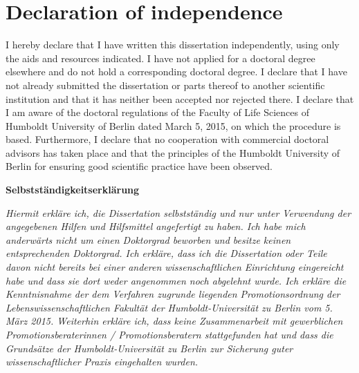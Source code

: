\backmatter
\mygeometry
{}
\RaggedRight

\mygeometry
\chapter{Declaration of independence}
\justifying
I hereby declare that I have written this dissertation independently, using only the aids and resources indicated. I have not applied for a doctoral degree elsewhere and do not hold a corresponding doctoral degree. I declare that I have not already submitted the dissertation or parts thereof to another scientific institution and that it has neither been accepted nor rejected there. I declare that I am aware of the doctoral regulations of the Faculty of Life Sciences of Humboldt University of Berlin dated March 5, 2015, on which the procedure is based. Furthermore, I declare that no cooperation with commercial doctoral advisors has taken place and that the principles of the Humboldt University of Berlin for ensuring good scientific practice have been observed.

\begin{center}
{\Large \textbf{Selbstständigkeitserklärung}}
\end{center}

\noindent \textit{Hiermit erkläre ich, die Dissertation selbstständig und nur unter Verwendung der angegebenen Hilfen und Hilfsmittel angefertigt zu haben. Ich habe mich anderwärts nicht um einen Doktorgrad beworben und besitze keinen entsprechenden Doktorgrad. Ich erkläre, dass ich die Dissertation oder Teile davon nicht bereits bei einer anderen wissenschaftlichen Einrichtung eingereicht habe und dass sie dort weder angenommen noch abgelehnt wurde. Ich erkläre die Kenntnisnahme der dem Verfahren zugrunde liegenden Promotionsordnung der Lebenswissenschaftlichen Fakultät der Humboldt-Universität zu Berlin vom 5. März 2015. Weiterhin erkläre ich, dass keine Zusammenarbeit mit gewerblichen Promotionsberaterinnen / Promotionsberatern stattgefunden hat und dass die Grundsätze der Humboldt-Universität zu Berlin zur Sicherung guter wissenschaftlicher Praxis eingehalten wurden.}

\vspace{0.5cm}

